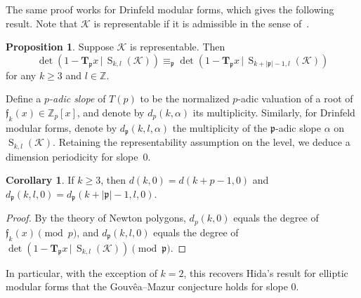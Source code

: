 \documentclass[10pt]{article}
\theoremstyle{definition}
\newtheorem{proposition}[theorem]{Proposition}
\newtheorem{corollary}[theorem]{Corollary}
\renewcommand{\:}{\colon}
\newcommand{\T}{\mathbf{T}}
\renewcommand{\S}{\operatorname{S}}
\newcommand{\f}{\mathfrak{f}}
\begin{document}
The same proof works for Drinfeld modular forms, which gives the following result. Note that $\mathcal K$ is representable if it is admissible in the sense of~\cite{bockle}.

\begin{proposition}
    Suppose $\mathcal K$ is representable. Then 
    \[
    \det(1-\T_{\mathfrak p}x \, | \, \S_{k,l}(\mathcal{K})) \equiv_{\mathfrak p} \det(1-\T_{\mathfrak p}x \, | \, \S_{k+|\mathfrak p|-1,l}(\mathcal K))
    \]
    for any $k \geq 3$ and $l \in \mathbb Z$. 
\end{proposition}

Define a \emph{$p$-adic slope} of $T(p)$ to be the normalized $p$-adic valuation of a root of $\f_{k}(x) \in \mathbb Z_p[x]$, and denote by $d_p(k,\alpha)$ its multiplicity. Similarly, for Drinfeld modular forms, denote by $d_{\mathfrak p}(k,l,\alpha)$ the multiplicity of the $\mathfrak p$-adic slope $\alpha$ on $\S_{k,l}(\mathcal{K})$. Retaining the representability assumption on the level, we deduce a dimension periodicity for slope~0.

\begin{corollary}\label{cor:GM}
    If $k \geq 3$, then $d(k,0) = d(k+p-1,0)$ and $d_{\mathfrak p}(k,l,0) = d_{\mathfrak p}(k+|\mathfrak p|-1,l,0)$.
\end{corollary}

\begin{proof}
By the theory of Newton polygons, $d_p(k,0)$ equals the degree of $\f_k(x) \pmod{p}$, and $d_{\mathfrak p}(k,l,0)$ equals the degree of $\det(1-\T_{\mathfrak p}x \, | \, \S_{k,l}(\mathcal K)) \pmod{\mathfrak p}$.
\end{proof}

In particular, with the exception of $k=2$, this recovers Hida's result for elliptic modular forms that the Gouv\^ea--Mazur conjecture holds for slope 0. 


\begingroup
\sloppy
 \printbibliography
\endgroup
\end{document}
